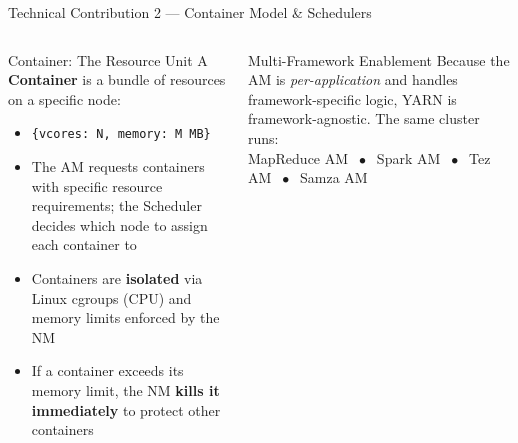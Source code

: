 \documentclass[aspectratio=169,10pt]{beamer}
\begin{document}
\begin{frame}{Technical Contribution 2 — Container Model \& Schedulers}
  \begin{columns}[T]
      \begin{block}{Container: The Resource Unit}
        A \textbf{Container} is a bundle of resources on a specific node:
        \begin{itemize}
          \item \texttt{\{vcores: N, memory: M\,MB\}}
          \item The AM requests containers with specific resource
                requirements; the Scheduler decides which node to
                assign each container to
          \item Containers are \textbf{isolated} via Linux cgroups
                (CPU) and memory limits enforced by the NM
          \item If a container exceeds its memory limit, the NM
                \textbf{kills it immediately} to protect other containers
        \end{itemize}
      \end{block}
      \vspace{5pt}
      \begin{exampleblock}{Multi-Framework Enablement}
        Because the AM is \emph{per-application} and handles
        framework-specific logic, YARN is framework-agnostic.
        The same cluster runs:\\
        MapReduce AM $\;\bullet\;$ Spark AM $\;\bullet\;$
        Tez AM $\;\bullet\;$ Samza AM
      \end{exampleblock}


\end{columns}
\end{frame}
\end{document}
